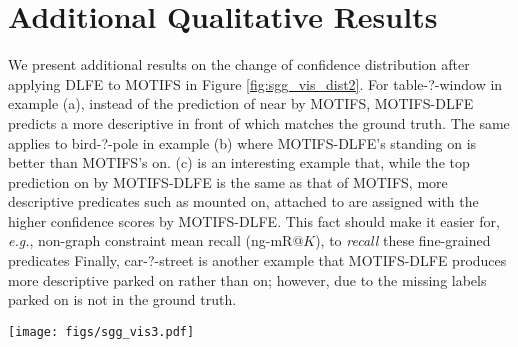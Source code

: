 \documentclass[sigconf]{acmart}
\begin{document}
\section{Additional Qualitative Results}
\label{sec:appendix_qualitative_results}
We present additional results on the change of confidence distribution after applying DLFE to MOTIFS in Figure \ref{fig:sgg_vis_dist2}. 
For {\selectfont table-?-window} in example (a), instead of the prediction of {\selectfont near} by MOTIFS, MOTIFS-DLFE predicts a more descriptive {\selectfont in front of} which matches the ground truth.
The same applies to {\selectfont bird-?-pole} in example (b) where MOTIFS-DLFE's {\selectfont standing on} is better than MOTIFS's {\selectfont on}. 
(c) is an interesting example that, while the top prediction {\selectfont on} by MOTIFS-DLFE is the same as that of MOTIFS, more descriptive predicates such as {\selectfont mounted on}, {\selectfont attached to} are assigned with the higher confidence scores by MOTIFS-DLFE.
This fact should make it easier for, \emph{e.g.}, non-graph constraint mean recall (ng-mR@$K$), to \textit{recall} these fine-grained predicates
Finally, {\selectfont car-?-street} is another example that MOTIFS-DLFE produces more descriptive {\selectfont parked on} rather than {\selectfont on}; however, due to the missing labels {\selectfont parked on} is not in the ground truth.

\begin{figure*}[t!]
\begin{center}
\texttt{[image: figs/sgg\_vis3.pdf]}
\end{center}
\vspace{-1em}
  \caption{Confidence distributions over the predicates, produced by MOTIFS (top of each example) and MOTIFS with DLFE (bottom). \textcolor{Green}{Green}, \textcolor{Red}{red} and \textcolor{Dandelion}{tangerine} predicates denote correct (GT), incorrect (Non-GT and weird) and acceptable (Non-GT but reasonable), respectively.}
\label{fig:sgg_vis_dist2}
\vspace{-1em}
\end{figure*}
\end{document}
